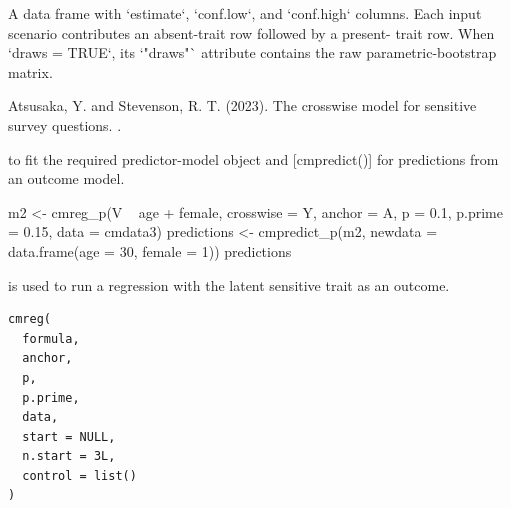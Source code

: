 \documentclass[a4paper]{book}
\begin{document}
%
\begin{Value}
A data frame with `estimate`, `conf.low`, and `conf.high` columns.
Each input scenario contributes an absent-trait row followed by a present-
trait row. When `draws = TRUE`, its `"draws"` attribute contains the raw
parametric-bootstrap matrix.
\end{Value}
%
\begin{References}
Atsusaka, Y. and Stevenson, R. T. (2023). The crosswise model
for sensitive survey questions. .
\end{References}
%
\begin{SeeAlso}
[cmreg\_p()] to fit the required predictor-model object and
[cmpredict()] for predictions from an outcome model.
\end{SeeAlso}
%
\begin{Examples}
\begin{ExampleCode}
m2 <- cmreg_p(V ~ age + female, crosswise = Y, anchor = A, p = 0.1,
              p.prime = 0.15, data = cmdata3)
predictions <- cmpredict_p(m2, newdata = data.frame(age = 30, female = 1))
predictions
\end{ExampleCode}
\end{Examples}
%
\begin{Description}
 is used to run a regression with the latent sensitive trait as an outcome.
\end{Description}
%
\begin{Usage}
\begin{verbatim}
cmreg(
  formula,
  anchor,
  p,
  p.prime,
  data,
  start = NULL,
  n.start = 3L,
  control = list()
)
\end{verbatim}
\end{Usage}
%
\end{document}
